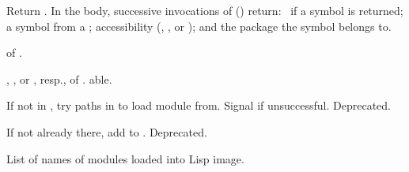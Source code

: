 \begin{LIST}{1cm}
  Return . In the body, successive
  invocations of  () return: \T\ if a symbol is returned;
  a symbol from a ; accessibility
  (, , or ); and the
  package the symbol belongs to.

   of .

  , , or , resp.,
  of . able. 

  If not in , try paths in  to load
  module from. Signal  if unsuccessful. Deprecated.

  If not already there, add  to
  . Deprecated. 

  List of names of modules loaded into Lisp image.

\end{LIST}
